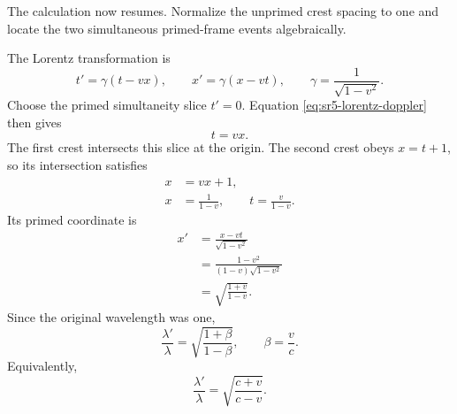 \begin{classroomqa}
\end{classroomqa}

\begin{classroomqa}
\end{classroomqa}

The calculation now resumes.  Normalize the unprimed crest spacing to one and
locate the two simultaneous primed-frame events algebraically.

The Lorentz transformation is
\begin{equation}
t'=\gamma(t-vx),
\qquad
x'=\gamma(x-vt),
\qquad
\gamma=\frac{1}{\sqrt{1-v^2}}.
\label{eq:sr5-lorentz-doppler}
\end{equation}
Choose the primed simultaneity slice \(t'=0\).  Equation
\eqref{eq:sr5-lorentz-doppler} then gives
\begin{equation}
t=vx.
\label{eq:sr5-primed-simultaneity}
\end{equation}
The first crest intersects this slice at the origin.  The second crest obeys
\(x=t+1\), so its intersection satisfies
\begin{align}
x&=vx+1,\\
x&=\frac{1}{1-v},
\qquad
t=\frac{v}{1-v}.
\end{align}
Its primed coordinate is
\begin{align}
x'
&=\frac{x-vt}{\sqrt{1-v^2}}\\
&=\frac{1-v^2}{(1-v)\sqrt{1-v^2}}\\
&=\sqrt{\frac{1+v}{1-v}}.
\end{align}
Since the original wavelength was one,
\begin{equation}
\boxed{
\frac{\lambda'}{\lambda}
=
\sqrt{\frac{1+\beta}{1-\beta}}
},
\qquad
\beta=\frac{v}{c}.
\label{eq:sr5-doppler}
\end{equation}
Equivalently,
\begin{equation}
\frac{\lambda'}{\lambda}
=
\sqrt{\frac{c+v}{c-v}}.
\end{equation}

